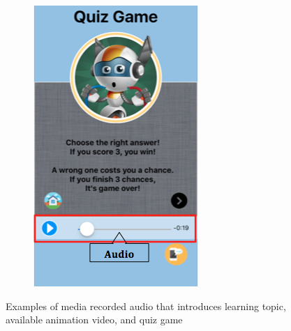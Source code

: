 \begin{figure}[H]
\begin{subfigure}{0.25\textwidth}
\includegraphics[width=\textwidth]{audio3}
\caption{}
    \end{subfigure}\hspace{0.03\textwidth}
  \caption{Examples of media recorded audio that introduces learning topic, available animation video, and quiz game}
\end{figure}

